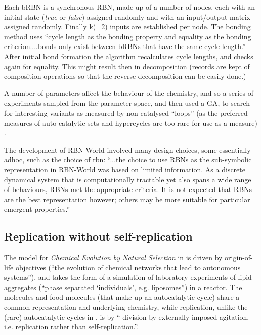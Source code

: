 Each bRBN is a synchronous RBN, made up of a number of nodes, each with an initial state (\emph{true} or \emph{false}) assigned randomly and with an input/output matrix assigned randomly. Finally k(=2) inputs are established per node. The bonding method uses ``cycle length as the bonding property and equality as the bonding criterion....bonds only exist between bRBNs that have the same cycle length.'' After initial bond formation the algorithm recalculates cycle lengths, and checks again for equality. This might result then in decomposition (records are kept of composition operations so that the reverse decomposition can be easily done.)

A number of parameters affect the behaviour of the chemistry, and so a series of experiments sampled from the parameter-space, and then used a GA, to search for interesting variants as measured by non-catalysed ``loops'' (as the preferred measures of auto-catalytic sets and \glspl{hypercycle} are too rare for use as a measure) \parencite[chap.8]{Faulconbridge2011}. 

The development of RBN-World involved many design choices, some essentially adhoc, such as the choice of \gls{rbn}: ``...the choice to use RBNs as the sub-symbolic representation in RBN-World was based on limited information. As a discrete dynamical system that is computationally tractable yet also spans a wide range of behaviours, RBNs met the appropriate criteria. It is not expected that RBNs are the best representation however; others may be more suitable for particular emergent properties.'' \parencite[p. 192]{Faulconbridge2011}

\subsection{Replication without self-replication}

The model for \emph{Chemical Evolution by Natural Selection} in \textcite{Fernando:2007pf, Fernando:2008xy} is driven by origin-of-life objectives (``the evolution of chemical networks that lead to autonomous systems''), and takes the form of a simulation of laboratory experiments of lipid aggregates (``phase separated ‘individuals’, e.g. liposomes'') in a reactor. The molecules and food molecules (that make up an autocatalytic cycle) share a common representation and underlying chemistry, while replication, unlike the (rare) autocatalytic cycles in \textcite{Faulconbridge2011}, is by `` division by externally imposed agitation, i.e. replication rather than self-replication.''.

